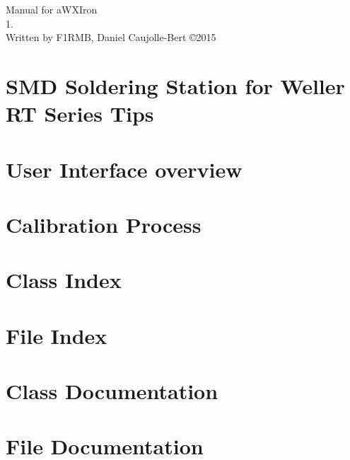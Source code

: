 \documentclass[twoside]{book}
\newcommand{\clearemptydoublepage}{%
  \newpage{\pagestyle{empty}\cleardoublepage}%
}
\begin{document}
\hypersetup{pageanchor=false}
\begin{titlepage}
\vspace*{7cm}
\begin{center}%
{\Large Manual for a\-W\-X\-Iron \\[1ex]\large 1. }\\
\vspace*{1cm}
{\large Written by F1RMB, Daniel Caujolle-Bert \copyright 2015 }\\
\vspace*{1cm}
\end{center}
\end{titlepage}
\clearemptydoublepage
\tableofcontents
\clearemptydoublepage
{}
\hypersetup{pageanchor=true}

\chapter{S\-M\-D Soldering Station for Weller R\-T Series Tips}
\label{mainpage}
\hypertarget{mainpage}{}

\chapter{User Interface overview}
\label{_u_i}
\hypertarget{_u_i}{}

\chapter{Calibration Process}
\label{cal}
\hypertarget{cal}{}

\chapter{Class Index}

\chapter{File Index}

\chapter{Class Documentation}






\chapter{File Documentation}























\newpage
{}
{}
\printindex
\end{document}
